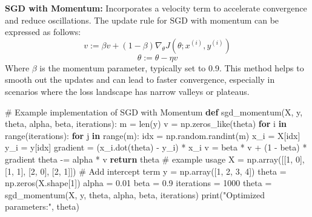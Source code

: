 \documentclass[
  letterpaper,
  DIV=11,
  numbers=noendperiod]{scrreprt}
\newenvironment{Shaded}{\begin{snugshade}}{\end{snugshade}}
\newcommand{\BuiltInTok}[1]{\textcolor[rgb]{0.00,0.23,0.31}{#1}}
\newcommand{\CommentTok}[1]{\textcolor[rgb]{0.37,0.37,0.37}{#1}}
\newcommand{\ControlFlowTok}[1]{\textcolor[rgb]{0.00,0.23,0.31}{\textbf{#1}}}
\newcommand{\DecValTok}[1]{\textcolor[rgb]{0.68,0.00,0.00}{#1}}
\newcommand{\FloatTok}[1]{\textcolor[rgb]{0.68,0.00,0.00}{#1}}
\newcommand{\KeywordTok}[1]{\textcolor[rgb]{0.00,0.23,0.31}{\textbf{#1}}}
\newcommand{\NormalTok}[1]{\textcolor[rgb]{0.00,0.23,0.31}{#1}}
\newcommand{\OperatorTok}[1]{\textcolor[rgb]{0.37,0.37,0.37}{#1}}
\newcommand{\StringTok}[1]{\textcolor[rgb]{0.13,0.47,0.30}{#1}}
\begin{document}
\textbf{SGD with Momentum:} Incorporates a velocity term to accelerate
convergence and reduce oscillations. The update rule for SGD with
momentum can be expressed as follows:
\[v := \beta v + (1 - \beta) \nabla_\theta J(\theta; x^{(i)}, y^{(i)})\]
\[\theta := \theta - \eta v\] Where \(\beta\) is the momentum parameter,
typically set to 0.9. This method helps to smooth out the updates and
can lead to faster convergence, especially in scenarios where the loss
landscape has narrow valleys or plateaus.

\begin{Shaded}
\begin{Highlighting}[]
   \CommentTok{\# Example implementation of SGD with Momentum}
\KeywordTok{def}\NormalTok{ sgd\_momentum(X, y, theta, alpha, beta, iterations):}
\NormalTok{    m }\OperatorTok{=} \BuiltInTok{len}\NormalTok{(y)}
\NormalTok{    v }\OperatorTok{=}\NormalTok{ np.zeros\_like(theta)}
    \ControlFlowTok{for}\NormalTok{ i }\KeywordTok{in} \BuiltInTok{range}\NormalTok{(iterations):}
        \ControlFlowTok{for}\NormalTok{ j }\KeywordTok{in} \BuiltInTok{range}\NormalTok{(m):}
\NormalTok{            idx }\OperatorTok{=}\NormalTok{ np.random.randint(m)}
\NormalTok{            x\_i }\OperatorTok{=}\NormalTok{ X[idx]}
\NormalTok{            y\_i }\OperatorTok{=}\NormalTok{ y[idx]}
\NormalTok{            gradient }\OperatorTok{=}\NormalTok{ (x\_i.dot(theta) }\OperatorTok{{-}}\NormalTok{ y\_i) }\OperatorTok{*}\NormalTok{ x\_i}
\NormalTok{            v }\OperatorTok{=}\NormalTok{ beta }\OperatorTok{*}\NormalTok{ v }\OperatorTok{+}\NormalTok{ (}\DecValTok{1} \OperatorTok{{-}}\NormalTok{ beta) }\OperatorTok{*}\NormalTok{ gradient}
\NormalTok{            theta }\OperatorTok{{-}=}\NormalTok{ alpha }\OperatorTok{*}\NormalTok{ v}
    \ControlFlowTok{return}\NormalTok{ theta  }
\CommentTok{\# example usage }
\NormalTok{X }\OperatorTok{=}\NormalTok{ np.array([[}\DecValTok{1}\NormalTok{, }\DecValTok{0}\NormalTok{], [}\DecValTok{1}\NormalTok{, }\DecValTok{1}\NormalTok{], [}\DecValTok{2}\NormalTok{, }\DecValTok{0}\NormalTok{], [}\DecValTok{2}\NormalTok{, }\DecValTok{1}\NormalTok{]])  }\CommentTok{\# Add intercept term}
\NormalTok{y }\OperatorTok{=}\NormalTok{ np.array([}\DecValTok{1}\NormalTok{, }\DecValTok{2}\NormalTok{, }\DecValTok{3}\NormalTok{, }\DecValTok{4}\NormalTok{])}
\NormalTok{theta }\OperatorTok{=}\NormalTok{ np.zeros(X.shape[}\DecValTok{1}\NormalTok{])}
\NormalTok{alpha }\OperatorTok{=} \FloatTok{0.01}
\NormalTok{beta }\OperatorTok{=} \FloatTok{0.9}
\NormalTok{iterations }\OperatorTok{=} \DecValTok{1000}
\NormalTok{theta }\OperatorTok{=}\NormalTok{ sgd\_momentum(X, y, theta, alpha, beta, iterations)}
\BuiltInTok{print}\NormalTok{(}\StringTok{"Optimized parameters:"}\NormalTok{, theta)}
\end{Highlighting}
\end{Shaded}
\end{document}
